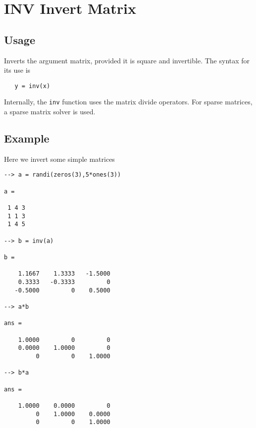 \section{INV Invert Matrix}

\subsection{Usage}

Inverts the argument matrix, provided it is square and invertible.
The syntax for its use is
\begin{verbatim}
   y = inv(x)
\end{verbatim}
Internally, the \verb|inv| function uses the matrix divide operators.
For sparse matrices, a sparse matrix solver is used.
\subsection{Example}

Here we invert some simple matrices
\begin{verbatim}
--> a = randi(zeros(3),5*ones(3))

a = 

 1 4 3 
 1 1 3 
 1 4 5 

--> b = inv(a)

b = 

    1.1667    1.3333   -1.5000 
    0.3333   -0.3333         0 
   -0.5000         0    0.5000 

--> a*b

ans = 

    1.0000         0         0 
    0.0000    1.0000         0 
         0         0    1.0000 

--> b*a

ans = 

    1.0000    0.0000         0 
         0    1.0000    0.0000 
         0         0    1.0000 
\end{verbatim}
